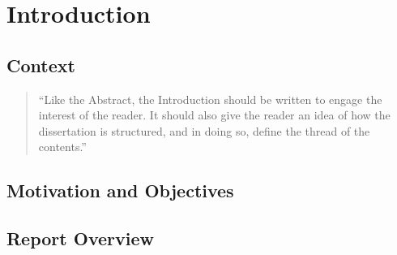 \chapter{Introduction}\label{chap:intro}

\section{Context}\label{sec:context}

\begin{quote}
  ``Like the Abstract, the Introduction should be written to engage the
  interest of the reader. It should also give the reader an idea of
  how the dissertation is structured, and in doing so, define the
  thread of the contents.''~\citep[chap.\ Introduction]{kn:Tha01}
\end{quote}

\section{Motivation and Objectives}\label{sec:goals}

\section{Report Overview}\label{sec:structure}

